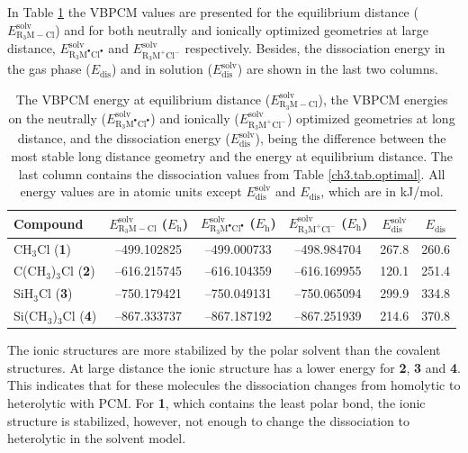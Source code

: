In Table \ref{ch3.tab.solution} the VBPCM values are presented for the equilibrium distance ($E_\mathrm{R_{3}M-Cl}^\mathrm{solv}$) and for both neutrally and ionically optimized geometries at large distance, $E_\mathrm{R_{3}M^\bullet Cl^\bullet}^\mathrm{solv}$ and $E_\mathrm{R_{3}M^{+} Cl^{-}}^\mathrm{solv}$ respectively. Besides, the dissociation energy in the gas phase ($E_\mathrm{dis}$) and in solution ($E_\mathrm{dis}^\mathrm{solv}$) are shown in the last two columns.
\begin{table}[htp]
\center
\caption{The VBPCM energy at equilibrium distance ($E_\mathrm{R_{3}M-Cl}^\mathrm{solv}$), the VBPCM energies on the neutrally ($E_\mathrm{R_{3}M^\bullet Cl^\bullet}^\mathrm{solv}$) and ionically ($E_\mathrm{R_{3}M^{+} Cl^{-}}^\mathrm{solv}$) optimized geometries at long distance, and the dissociation energy ($E_\mathrm{dis}^\mathrm{solv}$), being the difference between the most stable long distance geometry and the energy at equilibrium distance. The last column contains the dissociation values from Table \ref{ch3.tab.optimal}. All energy values are in atomic units except $E_\mathrm{dis}^\mathrm{solv}$ and $E_\mathrm{dis}$, which are in kJ/mol.}
\begin{tabular}{ l c c c c c}
\hline
\textbf{Compound} & $E_\mathrm{R_{3}M-Cl}^\mathrm{solv}$ ($E_{\mathrm{h}}$) & $E_\mathrm{R_{3}M^\bullet Cl^\bullet}^\mathrm{solv}$ ($E_{\mathrm{h}}$) & $E_\mathrm{R_{3}M^{+} Cl^{-}}^\mathrm{solv}$ ($E_{\mathrm{h}}$) & $E_\mathrm{dis}^\mathrm{solv}$&
$E_\mathrm{dis}$\\
\hline
CH$_3$Cl (\textbf{1})& --499.102825 & --499.000733 & --498.984704 & 267.8 & 260.6 \\
C(CH$_3$)$_3$Cl (\textbf{2})& --616.215745 & --616.104359 & --616.169955& 120.1 & 251.4 \\
SiH$_3$Cl (\textbf{3})& --750.179421& --750.049131 & --750.065094 &  299.9 & 334.8 \\
Si(CH$_3$)$_3$Cl (\textbf{4})& --867.333737 & --867.187192 &--867.251939& 214.6 & 370.8 \\
\end{tabular}
\label{ch3.tab.solution}
\end{table} 

The ionic structures are more stabilized by the polar solvent than the covalent structures. At large distance the ionic structure has a lower energy for \textbf{2}, \textbf{3} and \textbf{4}. This indicates that for these molecules the dissociation changes from homolytic to heterolytic with PCM. For \textbf{1}, which contains the least polar bond, the ionic structure is stabilized, however, not enough to change the dissociation to heterolytic in the solvent model.

